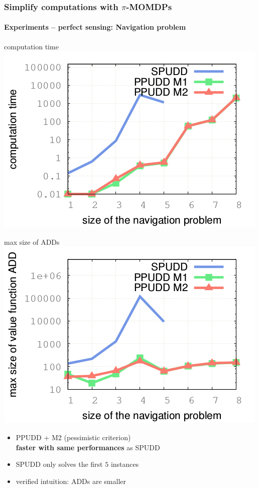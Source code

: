 \documentclass[12pt,svgnames,table]{beamer}
\begin{document}
\begin{frame}
\frametitle{Simplify computations with $\pi$-MOMDPs}
\framesubtitle{\footnotesize Experiments -- perfect sensing: Navigation problem}
\begin{minipage}{0.45\linewidth}
\centering
{\color{orange} computation time} \\
\includegraphics[scale=0.4]{courbeTime.png} 
\end{minipage}
\hspace{0.13cm}
\begin{minipage}{0.45\linewidth}
{\hspace{0.5cm} \color{orange} max size of ADDs} \\
\includegraphics[scale=0.3]{courbeADD.png}  
\end{minipage}
\begin{alertblock}{}
\centering
\begin{itemize}
\item PPUDD + M2 (pessimistic criterion)\\ 
\textbf{faster with same performances} as SPUDD
\item SPUDD only solves the first $5$ instances
\item verified intuition: ADDs are smaller
\end{itemize}
\end{alertblock}
\end{frame}
\end{document}
